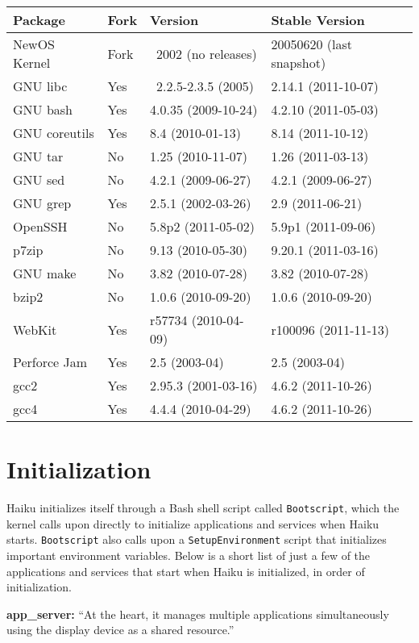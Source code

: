 \documentclass{article}
\begin{document}
\begin{tabular}{l l l l}
\toprule
Package & Fork & Version & Stable Version \\
\midrule
NewOS Kernel & Fork & ~2002 (no releases) & 20050620 (last snapshot) \\
\midrule
GNU libc & Yes & ~2.2.5-2.3.5 (2005) & 2.14.1 (2011-10-07) \\
\midrule
GNU bash & Yes & 4.0.35 (2009-10-24) & 4.2.10 (2011-05-03) \\
\midrule
GNU coreutils & Yes & 8.4 (2010-01-13) & 8.14 (2011-10-12) \\
\midrule
GNU tar & No & 1.25 (2010-11-07) & 1.26 (2011-03-13) \\
\midrule
GNU sed & No & 4.2.1 (2009-06-27) & 4.2.1 (2009-06-27) \\
\midrule
GNU grep & Yes & 2.5.1 (2002-03-26) & 2.9 (2011-06-21) \\
\midrule
OpenSSH & No & 5.8p2 (2011-05-02) & 5.9p1 (2011-09-06) \\
\midrule
p7zip & No & 9.13 (2010-05-30) & 9.20.1 (2011-03-16) \\
\midrule
GNU make & No & 3.82 (2010-07-28) & 3.82 (2010-07-28) \\
\midrule
bzip2 & No & 1.0.6 (2010-09-20) & 1.0.6 (2010-09-20) \\
\midrule
WebKit & Yes & r57734 (2010-04-09) & r100096 (2011-11-13) \\
\midrule
Perforce Jam & Yes & 2.5 (2003-04) & 2.5 (2003-04) \\
\midrule
gcc2 & Yes & 2.95.3 (2001-03-16) & 4.6.2 (2011-10-26) \\
\midrule
gcc4 & Yes & 4.4.4 (2010-04-29) & 4.6.2 (2011-10-26) \\
\bottomrule
\end{tabular}

\section{Initialization}

Haiku initializes itself through a Bash shell script called \texttt{Bootscript}, which the kernel calls upon directly to initialize applications and services when Haiku starts. \texttt{Bootscript} also calls upon a \texttt{SetupEnvironment} script that initializes important environment variables. Below is a short list of just a few of the applications and services that start when Haiku is initialized, in order of initialization.

\textbf{app\_server:}
``At the heart, it manages multiple applications simultaneously using the display device as a shared resource.''\cite{AppServer}
\end{document}
